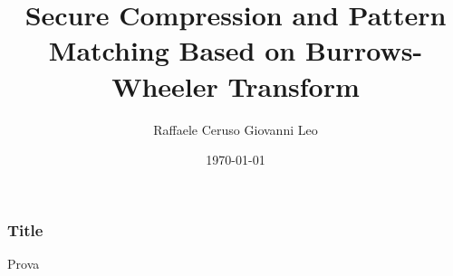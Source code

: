 \documentclass{beamer}
\title{Secure Compression and Pattern Matching Based on Burrows-Wheeler Transform}
\author{Raffaele Ceruso Giovanni Leo}
\date{\today}
\begin{document}
\begin{frame}
	\titlepage
\end{frame}
\begin{frame}
\frametitle{Title}
Prova
\end{frame}
\end{document}
